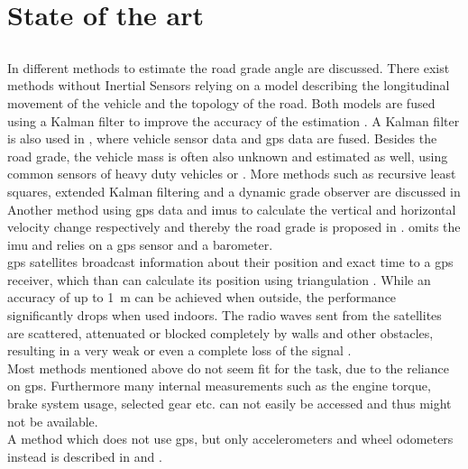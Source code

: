 \chapter{State of the art}
\label{ch:StateOfTheArt}

\section{}
In \cite{Jauch2018} different methods to estimate the road grade angle are discussed.
There exist methods without Inertial Sensors relying on a model describing the longitudinal movement of the vehicle and the topology of the road.
Both models are fused using a Kalman filter to improve the accuracy of the estimation \cite{Sahlholm2007}.
A Kalman filter is also used in \cite{Sahlholm2010}, where vehicle sensor data and \gls{gps} data are fused.
Besides the road grade, the vehicle mass is often also unknown and estimated as well, using common sensors of heavy duty vehicles \cite{Sahlholm2010}  or  \cite{Maleej2014}.
More methods such as recursive least squares, extended Kalman filtering and a dynamic grade observer are discussed in \cite{Kidambi2014}
Another method using \gls{gps} data and \gls{imu}s to calculate the vertical and horizontal velocity change respectively and thereby the road grade is proposed in \cite{Ryu2004}.
\cite{YazdaniBoroujeni2014} omits the \gls{imu} and relies on a \gls{gps} sensor and a barometer.\\
\gls{gps} satellites broadcast information about their position and exact time to a \gls{gps} receiver, which than can calculate its position using triangulation \cite{Mainetti2014}.
While an accuracy of up to \SI{1}{\metre} can be achieved when outside, the performance significantly drops when used indoors.
The radio waves sent from the satellites are scattered, attenuated or blocked completely by walls and other obstacles, resulting in a very weak or even a complete loss of the signal \cite{Ozdenizci2015}.\\
Most methods mentioned above do not seem fit for the task, due to the reliance on \gls{gps}.
Furthermore many internal measurements such as the engine torque, brake system usage, selected gear etc. can not easily be accessed and thus might not be available.\\
A method which does not use \gls{gps}, but only accelerometers and wheel odometers instead is described in \cite{Nilsson2012} and \cite{Palella2016}.
